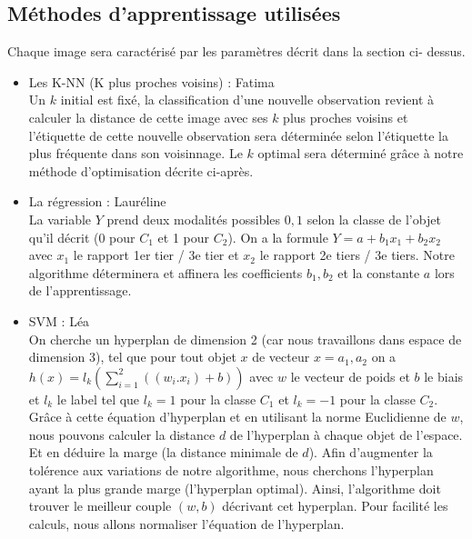\documentclass[a4paper,10pt]{article}
\begin{document}
	\subsection{Méthodes d'apprentissage utilisées}
		Chaque image sera caractérisé par les paramètres décrit dans la section ci- dessus. 
		\begin{itemize}
			\item Les K-NN (K plus proches voisins) : Fatima\\
			Un $k$ initial est fixé, la classification d'une nouvelle observation revient à calculer la distance de cette image avec ses $k$ plus proches voisins et l'étiquette de cette nouvelle observation sera déterminée selon l'étiquette la plus fréquente dans son voisinnage. Le $k$ optimal sera déterminé grâce à notre méthode d'optimisation décrite ci-après.
			\item La régression : Lauréline\\
			La variable $Y$ prend deux modalités possibles ${0, 1}$ selon la classe de l'objet qu'il décrit (0 pour $C_1$ et 1 pour $C_2$). On a la formule $Y = a + b_1 x_1+ b_2 x_2$ avec $x_1$ le rapport 1er tier / 3e tier et $x_2$ le rapport 2e tiers / 3e tiers. Notre algorithme déterminera et affinera les coefficients $b_1, b_2$ et la constante $a$ lors de l'apprentissage.
			\item SVM : Léa\\
			On cherche un hyperplan de dimension 2 (car nous travaillons dans espace de dimension 3), tel que pour tout objet $x$ de vecteur $x = {a_1, a_2} $ on a $h(x) = l_k (\sum_{i = 1} ^2 ((w_i . x_i ) + b ) )$ avec $w$ le vecteur de poids et $b$ le biais et $l_k$ le label tel que $l_k = 1 $ pour la classe $C_1$ et $l_k = -1$ pour la classe $C_2$. Grâce à cette équation d'hyperplan et en utilisant la norme Euclidienne de $w$, nous pouvons calculer la distance $d$ de l'hyperplan à chaque objet de l'espace. Et en déduire la marge (la distance minimale de $d$). Afin d'augmenter la tolérence aux variations de notre algorithme, nous cherchons l'hyperplan ayant la plus grande marge (l'hyperplan optimal). Ainsi, l'algorithme doit trouver le meilleur couple $(w, b)$ décrivant cet hyperplan. Pour facilité les calculs, nous allons normaliser l'équation de l'hyperplan.
		\end{itemize}
\end{document}
